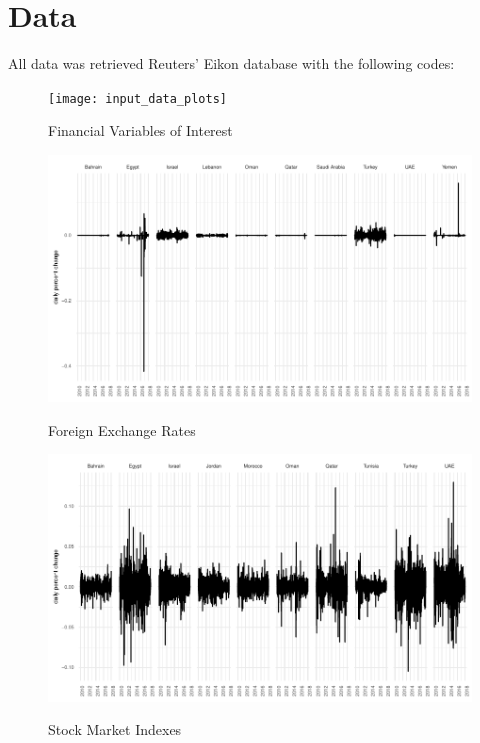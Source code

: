 \documentclass[a4paper]{article}
\begin{document}
\section{Data}

All data was retrieved Reuters' Eikon database with the following codes:


\begin{figure}[H]
	\centering
    	\caption{Financial Variables of Interest}
    	\texttt{[image: input\_data\_plots]}
	\label{figure:rawvars}
\end{figure}

\begin{figure}[H]
	\centering
	\caption{Foreign Exchange Rates}
	\includegraphics{fx_transformed}
	\label{figure:fxtransformed} 
\end{figure}

\begin{figure}[H]
	\centering
	\caption{Stock Market Indexes}
	\includegraphics{stock_index_transformed}
	\label{figure:stocktransformed} 
\end{figure}
\end{document}
